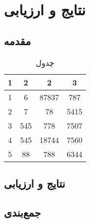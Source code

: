 \chapter{نتایج و ارزیابی}
\section{مقدمه}


\begin{table}[h!]
    \centering
    \begin{tabular}{||c c c c||} 
     \hline
     1 & 2 & 2 & 3 \\ [0.5ex] 
     \hline\hline
     1 & 6 & 87837 & 787 \\ 
     2 & 7 & 78 & 5415 \\
     3 & 545 & 778 & 7507 \\
     4 & 545 & 18744 & 7560 \\
     5 & 88 & 788 & 6344 \\ [1ex] 
     \hline
    \end{tabular}
    \caption{چدول}
    \label{table:1}
\end{table}


\section{نتایج و ارزیابی}

\section{جمع‌بندی}